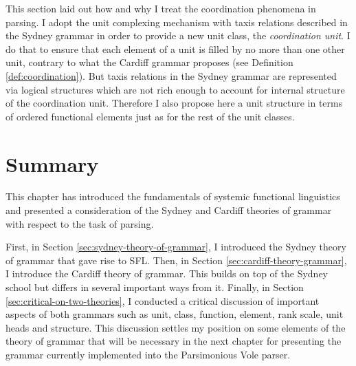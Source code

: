 

This section laid out how and why I treat the coordination phenomena in parsing. I adopt the unit complexing mechanism with taxis relations described in the Sydney grammar in order to provide a new unit class, the \textit{coordination unit}. I do that to ensure that each element of a unit is filled by no more than one other unit, contrary to what the Cardiff grammar proposes (see Definition \ref{def:coordination}). But taxis relations in the Sydney grammar are represented via logical structures which are not rich enough to account for internal structure of the coordination unit. Therefore I also propose here a unit structure in terms of ordered functional elements just as for the rest of the unit classes. 

\section{Summary}
    This chapter has introduced the fundamentals of systemic functional linguistics and presented a consideration of the Sydney and Cardiff theories of grammar with respect to the task of parsing.
    
    First, in Section \ref{sec:sydney-theory-of-grammar}, I introduced the Sydney theory of grammar that gave rise to SFL. Then, in Section \ref{sec:cardiff-theory-grammar}, I introduce the Cardiff theory of grammar. This builds on top of the Sydney school but differs in several important ways from it. Finally, in Section \ref{sec:critical-on-two-theories}, I conducted a critical discussion of important aspects of both grammars such as unit, class, function, element, rank scale, unit heads and structure. This discussion settles my position on some elements of the theory of grammar that will be necessary in the next chapter for presenting the grammar currently implemented into the Parsimonious Vole parser.

